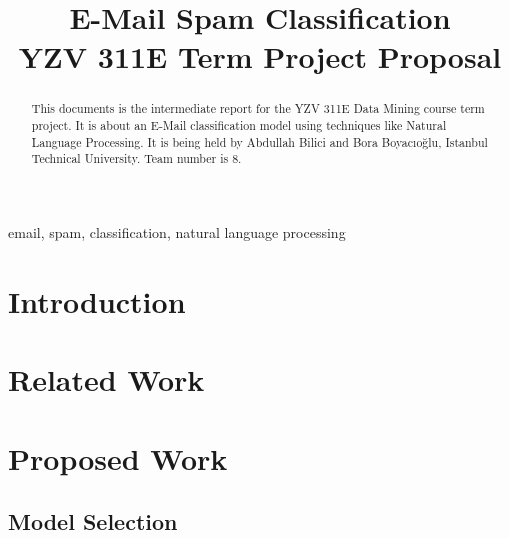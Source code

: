 \documentclass[conference]{IEEEtran}
\begin{document}
\title{E-Mail Spam Classification\\
{\Large YZV 311E Term Project Proposal}
}

\author{
\and
{}
}

\maketitle

\begin{abstract}
This documents is the intermediate report for the YZV 311E Data Mining course term project. It is about an E-Mail classification model using techniques like Natural Language Processing. It is being held by Abdullah Bilici and Bora Boyacıoğlu, Istanbul Technical University. Team number is 8.
\end{abstract}

\begin{IEEEkeywords}
email, spam, classification, natural language processing
\end{IEEEkeywords}

\section{Introduction}

\section{Related Work}

\section{Proposed Work}

\subsection{Model Selection}
\end{document}
